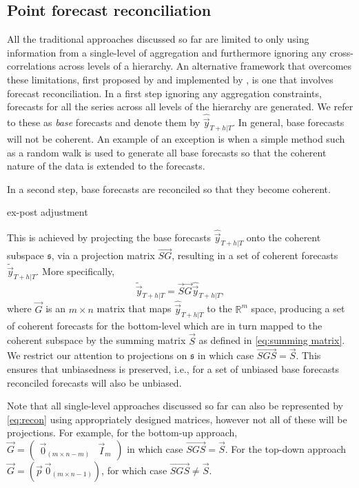 \documentclass[graybox]{svmult}
\begin{document}
\subsection{Point forecast reconciliation}\label{sec:reconciliation approaches}

All the traditional approaches discussed so far are limited to only using information from a single-level of aggregation and furthermore ignoring any cross-correlations across levels of a hierarchy. An alternative framework that overcomes these limitations, first proposed by \citet{HynEtAl2011} and implemented by \citet{AthEtAl2009}, is one that involves forecast reconciliation. In a first step ignoring any aggregation constraints, forecasts for all the series across all levels of the hierarchy are generated. We refer to these as \textit{base} forecasts and denote them by $\hat{\vec{y}}_{T+h|T}$. In general, base forecasts will not be coherent. An example of an exception is when a simple method such as a random walk is used to generate all base forecasts so that the coherent nature of the data is extended to the forecasts.

In a second step, base forecasts are reconciled so that they become coherent.

ex-post adjustment


This is achieved by projecting the base forecasts $\hat{\vec{y}}_{T+h|T}$ onto the coherent subspace $\mathfrak{s}$, via a projection matrix $\vec{SG}$, resulting in a set of coherent forecasts $\tilde{\vec{y}}_{T+h|T}$. More specifically,
\begin{equation}\label{eq:recon}
\tilde{\vec{y}}_{T+h|T}=\vec{S}\vec{G}\hat{\vec{y}}_{T+h|T},
\end{equation}
where $\vec{G}$ is an $m\times n$ matrix that maps $\hat{\vec{y}}_{T+h|T}$ to the $\mathbb{R}^m$ space, producing a set of coherent forecasts for the bottom-level which are in turn mapped to the coherent subspace by the summing matrix $\vec{S}$ as defined in \eqref{eq:summing matrix}. We restrict our attention to projections on $\mathfrak{s}$ in which case $\vec{SGS}=\vec{S}$. This ensures that unbiasedness is preserved, i.e., for a set of unbiased base forecasts reconciled forecasts will also be unbiased.



Note that all single-level approaches discussed so far can also be represented by \eqref{eq:recon} using appropriately designed  matrices, however not all of these will be projections. For example, for the bottom-up approach, $\vec{G}=\begin{pmatrix}
\vec{0}_{(m \times n-m)} & \vec{I}_m
\end{pmatrix}$ in which case $\vec{SGS}=\vec{S}$. For the top-down approach $\vec{G}=(\vec{p}~\vec{0}_{(m \times n-1)})$, for which case $\vec{SGS}\ne\vec{S}$.
\end{document}
